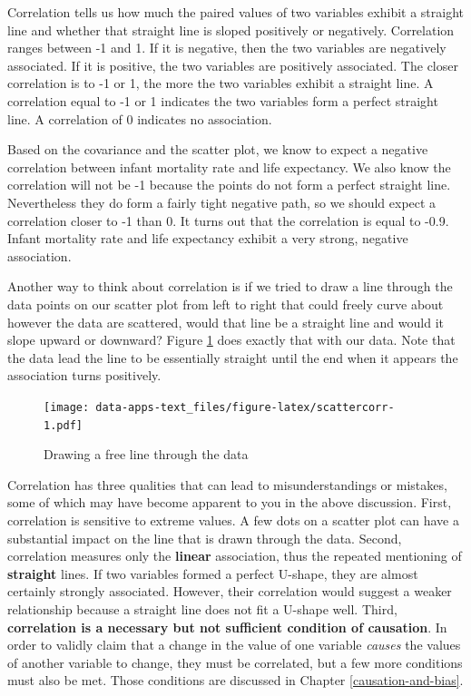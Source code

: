 \documentclass[
]{book}
\begin{document}
Correlation tells us how much the paired values of two variables exhibit a straight line and whether that straight line is sloped positively or negatively. Correlation ranges between -1 and 1. If it is negative, then the two variables are negatively associated. If it is positive, the two variables are positively associated. The closer correlation is to -1 or 1, the more the two variables exhibit a straight line. A correlation equal to -1 or 1 indicates the two variables form a perfect straight line. A correlation of 0 indicates no association.

Based on the covariance and the scatter plot, we know to expect a negative correlation between infant mortality rate and life expectancy. We also know the correlation will not be -1 because the points do not form a perfect straight line. Nevertheless they do form a fairly tight negative path, so we should expect a correlation closer to -1 than 0. It turns out that the correlation is equal to -0.9. Infant mortality rate and life expectancy exhibit a very strong, negative association.

Another way to think about correlation is if we tried to draw a line through the data points on our scatter plot from left to right that could freely curve about however the data are scattered, would that line be a straight line and would it slope upward or downward? Figure \ref{fig:scattercorr} does exactly that with our data. Note that the data lead the line to be essentially straight until the end when it appears the association turns positively.

\begin{figure}
\centering
\texttt{[image: data-apps-text\_files/figure-latex/scattercorr-1.pdf]}
\caption{\label{fig:scattercorr}Drawing a free line through the data}
\end{figure}

Correlation has three qualities that can lead to misunderstandings or mistakes, some of which may have become apparent to you in the above discussion. First, correlation is sensitive to extreme values. A few dots on a scatter plot can have a substantial impact on the line that is drawn through the data. Second, correlation measures only the \textbf{linear} association, thus the repeated mentioning of \textbf{straight} lines. If two variables formed a perfect U-shape, they are almost certainly strongly associated. However, their correlation would suggest a weaker relationship because a straight line does not fit a U-shape well. Third, \textbf{correlation is a necessary but not sufficient condition of causation}. In order to validly claim that a change in the value of one variable \emph{causes} the values of another variable to change, they must be correlated, but a few more conditions must also be met. Those conditions are discussed in Chapter \ref{causation-and-bias}.
\end{document}
